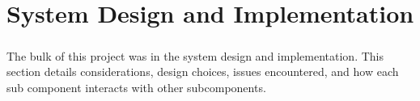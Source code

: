 \chapter{System Design and Implementation}

\paragraph{}
The bulk of this project was in the system design and implementation.
This section details considerations, design choices, issues encountered, and how each sub component interacts with other subcomponents.